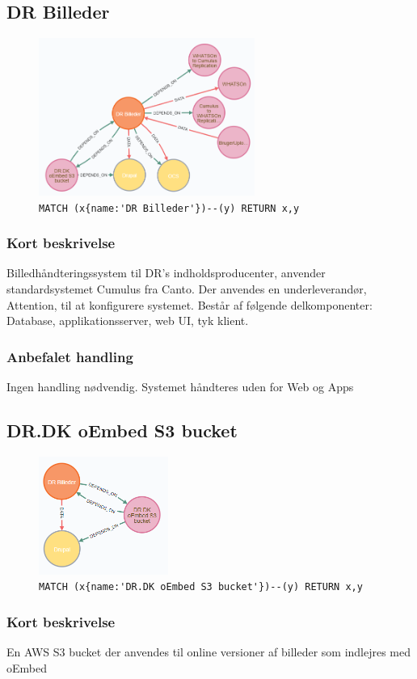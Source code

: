 \documentclass{article}
\begin{document}
\subsection{DR Billeder}
\begin{figure}[H]
\includegraphics[width=200pt]{DRBilleder.PNG}
\cprotect\caption{\verb|MATCH (x{name:'DR Billeder'})--(y) RETURN x,y|}
\end{figure}
\subsubsection*{Kort beskrivelse}
Billedhåndteringssystem til DR's indholdsproducenter, anvender standardsystemet Cumulus fra Canto. Der anvendes en underleverandør, Attention, til at konfigurere systemet. Består af følgende delkomponenter: Database, applikationsserver, web UI, tyk klient.
\subsubsection*{Anbefalet handling}
Ingen handling nødvendig. Systemet håndteres uden for Web og Apps



\subsection{DR.DK oEmbed S3 bucket}
\begin{figure}[H]
\includegraphics[width=120pt]{S3Bucket.PNG}
\cprotect\caption{\verb|MATCH (x{name:'DR.DK oEmbed S3 bucket'})--(y) RETURN x,y|}
\end{figure}
\subsubsection*{Kort beskrivelse}
En AWS S3 bucket der anvendes til online versioner af billeder som indlejres med oEmbed
\end{document}

